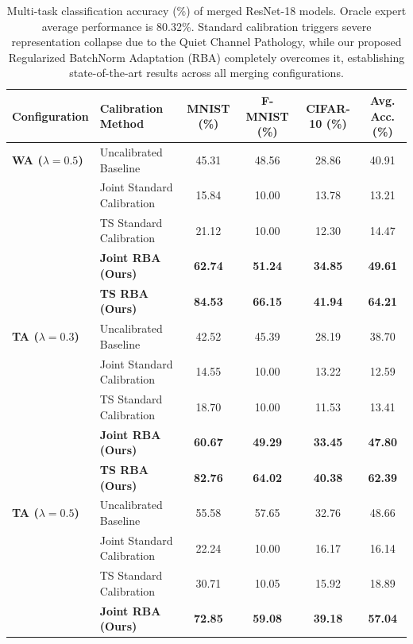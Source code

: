 \documentclass{article}
\begin{document}
\begin{table}[t]
  \caption{Multi-task classification accuracy (\%) of merged ResNet-18 models. Oracle expert average performance is 80.32\%. Standard calibration triggers severe representation collapse due to the Quiet Channel Pathology, while our proposed Regularized BatchNorm Adaptation (RBA) completely overcomes it, establishing state-of-the-art results across all merging configurations.}
  \label{tab:results}
  \vskip 0.15in
  \begin{center}
    \begin{small}
      \begin{tabular}{llcccc}
        \toprule
        Configuration & Calibration Method & MNIST (\%) & F-MNIST (\%) & CIFAR-10 (\%) & Avg. Acc. (\%) \\
        \midrule
        \textbf{WA ($\lambda=0.5$)} & Uncalibrated Baseline & 45.31 & 48.56 & 28.86 & 40.91 \\
        & Joint Standard Calibration & 15.84 & 10.00 & 13.78 & 13.21 \\
        & TS Standard Calibration & 21.12 & 10.00 & 12.30 & 14.47 \\
        & \textbf{Joint RBA (Ours)} & \textbf{62.74} & \textbf{51.24} & \textbf{34.85} & \textbf{49.61} \\
        & \textbf{TS RBA (Ours)} & \textbf{84.53} & \textbf{66.15} & \textbf{41.94} & \textbf{64.21} \\
        \midrule
        \textbf{TA ($\lambda=0.3$)} & Uncalibrated Baseline & 42.52 & 45.39 & 28.19 & 38.70 \\
        & Joint Standard Calibration & 14.55 & 10.00 & 13.22 & 12.59 \\
        & TS Standard Calibration & 18.70 & 10.00 & 11.53 & 13.41 \\
        & \textbf{Joint RBA (Ours)} & \textbf{60.67} & \textbf{49.29} & \textbf{33.45} & \textbf{47.80} \\
        & \textbf{TS RBA (Ours)} & \textbf{82.76} & \textbf{64.02} & \textbf{40.38} & \textbf{62.39} \\
        \midrule
        \textbf{TA ($\lambda=0.5$)} & Uncalibrated Baseline & 55.58 & 57.65 & 32.76 & 48.66 \\
        & Joint Standard Calibration & 22.24 & 10.00 & 16.17 & 16.14 \\
        & TS Standard Calibration & 30.71 & 10.05 & 15.92 & 18.89 \\
        & \textbf{Joint RBA (Ours)} & \textbf{72.85} & \textbf{59.08} & \textbf{39.18} & \textbf{57.04} \\

\end{tabular}
\end{small}
\end{center}
\end{table}
\end{document}
